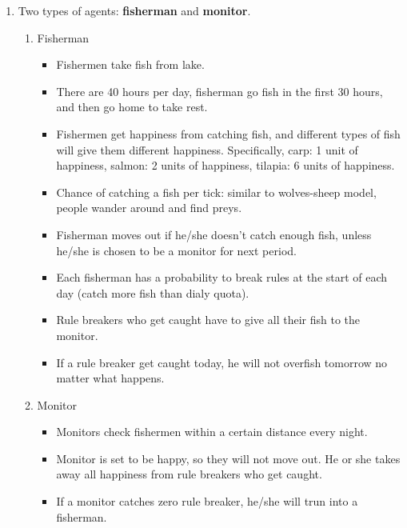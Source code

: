 \documentclass[12pt]{article}
\begin{document}
\begin{enumerate}
	\item Two types of agents: \textbf{fisherman} and \textbf{monitor}.
	\begin{enumerate}
		\item Fisherman
		\begin{itemize}
			\item Fishermen take fish from lake.
			\item There are 40 hours per day, fisherman go fish in the first 30 hours, and then go home to take rest.
			\item Fishermen get happiness from catching fish, and different types of fish will give them different happiness. Specifically, carp: 1 unit of happiness, salmon: 2 units of happiness, tilapia: 6 units of happiness.
			\item Chance of catching a fish per tick: similar to wolves-sheep model, people wander around and find preys.
			\item Fisherman moves out if he/she doesn't catch enough fish, unless he/she is chosen to be a monitor for next period.
			\item Each fisherman has a probability to break rules at the start of each day (catch more fish than dialy quota). 
			\item Rule breakers who get caught have to give all their fish to the monitor.
			\item If a rule breaker get caught today, he will not overfish tomorrow no matter what happens.
		\end{itemize}
		
		
		\item Monitor
		\begin{itemize}
			\item Monitors check fishermen within a certain distance every night.
			\item Monitor is set to be happy, so they will not move out. He or she takes away all happiness from rule breakers who get caught.
			\item If a monitor catches zero rule breaker, he/she will trun into a fisherman.
		\end{itemize}
	\end{enumerate}
	


\end{enumerate}
\end{document}
